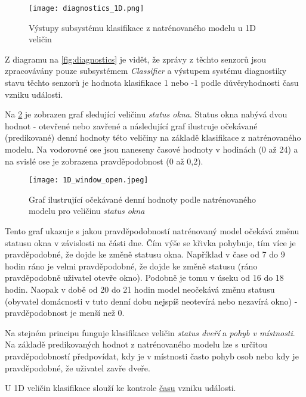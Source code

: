 \begin{figure}[H]
  \centering
  \texttt{[image: diagnostics\_1D.png]}
  \caption{Výstupy subsystému klasifikace z natrénovaného modelu u 1D veličin}
  \label{fig:diagnostics_1D}
\end{figure}  

Z diagramu na \cref{fig:diagnostics} je vidět, že zprávy z těchto senzorů jsou zpracovávány pouze subsystémem \textit{Classifier} a výstupem systému diagnostiky stavu těchto senzorů je hodnota klasifikace 1 nebo -1 podle důvěryhodnosti času vzniku události. 

Na \cref{fig:1D_window_open} je zobrazen graf sledující veličinu \textit{status okna}. Status okna nabývá dvou hodnot - otevřené nebo zavřené a následující graf ilustruje očekávané (predikované) denní hodnoty této veličiny na základě klasifikace z natrénovaného modelu. Na vodorovné ose jsou naneseny časové hodnoty v hodinách (0 až 24) a na svislé ose je zobrazena pravděpodobnost (0 až 0,2). 

\begin{figure}[H]
  \centering
  \texttt{[image: 1D\_window\_open.jpeg]}
  \caption{Graf ilustrující očekávané denní hodnoty podle natrénovaného modelu pro veličinu \textit{status okna}}
  \label{fig:1D_window_open}
\end{figure}  

Tento graf ukazuje s jakou pravděpodobností natrénovaný model očekává změnu statusu okna v závislosti na části dne. Čím výše se křivka pohybuje, tím více je pravděpodobné, že dojde ke změně statusu okna. Například v čase od 7 do 9 hodin ráno je velmi pravděpodobné, že dojde ke změně statusu (ráno pravděpodobně uživatel otevře okno). Podobně je tomu v úseku od 16 do 18 hodin. Naopak v době od 20 do 21 hodin model neočekává změnu statusu (obyvatel domácnosti v tuto denní dobu nejspíš neotevírá nebo nezavírá okno) - pravděpodobnost je menší než 0. \par
Na stejném principu funguje klasifikace veličin \textit{status dveří} a \textit{pohyb v místnosti}. Na základě predikovaných hodnot z natrénovaného modelu lze s určitou pravděpodobností předpovídat, kdy je v místnosti často pohyb osob nebo kdy je pravděpodobné, že uživatel zavře dveře. \par
U 1D veličin klasifikace slouží ke kontrole \underline{času} vzniku události.

